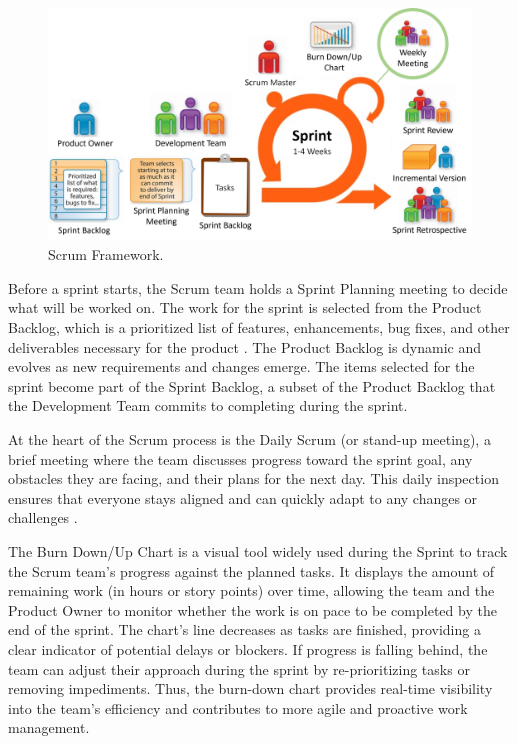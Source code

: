 \begin{figure}
    \centering
    \includegraphics[width=1\linewidth]{images/scrum.png}
    \caption{Scrum Framework.}
    \label{fig:scrum}
\end{figure}

Before a sprint starts, the Scrum team holds a Sprint Planning meeting to decide what will
be worked on. The work for the sprint is selected from the Product Backlog, which is a
prioritized list of features, enhancements, bug fixes, and other deliverables necessary
for the product \parencite{schwaber2020scrum}. The Product Backlog is dynamic and evolves as
new requirements and changes emerge. The items selected for the sprint become part of the
Sprint Backlog, a subset of the Product Backlog that the Development Team commits to
completing during the sprint.

At the heart of the Scrum process is the Daily Scrum (or stand-up meeting), a brief
meeting where the team discusses progress toward the sprint goal, any obstacles they are
facing, and their plans for the next day. This daily inspection ensures that everyone
stays aligned and can quickly adapt to any changes or challenges \parencite{cobb2015scrum}.

The Burn Down/Up Chart is a visual tool widely used during the Sprint to track the Scrum
team's progress against the planned tasks. It displays the amount of remaining work (in
hours or story points) over time, allowing the team and the Product Owner to monitor
whether the work is on pace to be completed by the end of the sprint. The chart's line
decreases as tasks are finished, providing a clear indicator of potential delays or
blockers. If progress is falling behind, the team can adjust their approach during the
sprint by re-prioritizing tasks or removing impediments. Thus, the burn-down chart provides
real-time visibility into the team’s efficiency and contributes to more agile and
proactive work management.

